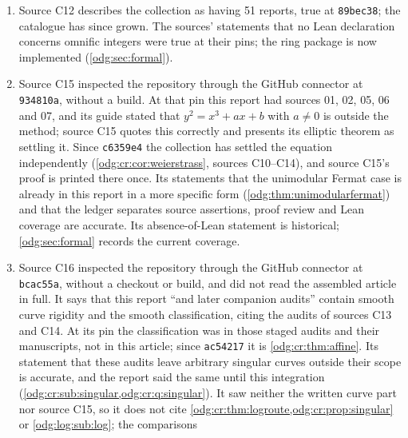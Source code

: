 \documentclass[11pt,oneside]{article}
\numberwithin{equation}{section}
\theoremstyle{definition}
\theoremstyle{remark}
\newcommand{\fn}[1]{\nolinkurl{#1}}
\begin{document}
\begin{enumerate}[leftmargin=*]
\nolinkurl{4c26f4e4bee62f76428d7c69adf4aabe5af5ec53} at \texttt{4cdeaec} (C10, C13,
C14) and \nolinkurl{47af413cd5f5d186a8c1391514d69e9933034498} at \texttt{89bec38}
(C12), the same blob as at \texttt{f6e031a} (C11). Source C14 describes the report as a three-source
assembly and source C11 says that its guide separates the reviewed Sections 1--7 from
later material; both were true at their pins. The report now has fourteen sources, and
the reviews recorded in \fn{RECONCILIATION.md} extend further, but do not cover
\cref{odg:cr:sec:principle,odg:cr:sec:curves,odg:cr:sec:groups}.
\item Source C12 describes the collection as having 51 reports, true at
\texttt{89bec38}; the catalogue has since grown. The sources' statements that no Lean
declaration concerns omnific integers were true at their pins; the ring package
is now implemented (\cref{odg:sec:formal}).
\item Source C15 inspected the repository through the GitHub connector at
\texttt{934810a}, without a build. At that pin this report had sources 01, 02, 05, 06
and 07, and its guide stated that $y^2=x^3+ax+b$ with $a\ne0$ is outside the method;
source C15 quotes this correctly and presents its elliptic theorem as settling it. Since
\texttt{c6359e4} the collection has settled the equation independently
(\cref{odg:cr:cor:weierstrass}, sources C10--C14), and source C15's proof is printed
there once. Its statements that the unimodular Fermat case is already in this report in a
more specific form (\cref{odg:thm:unimodularfermat}) and that the ledger separates source
assertions, proof review and Lean coverage are accurate. Its absence-of-Lean
statement is historical; \cref{odg:sec:formal} records the current coverage.
\item Source C16 inspected the repository through the GitHub connector at
\texttt{bcac55a}, without a checkout or build, and did not read the assembled article in
full. It says that this report ``and later companion audits'' contain smooth curve
rigidity and the smooth classification, citing the audits of sources C13 and C14. At its
pin the classification was in those staged audits and their manuscripts, not in this
article; since \texttt{ac54217} it is \cref{odg:cr:thm:affine}. Its statement that these
audits leave arbitrary singular curves outside their scope is accurate, and the report
said the same until this integration (\cref{odg:cr:sub:singular,odg:cr:q:singular}). It saw
neither the written curve part nor source C15, so it does not cite
\cref{odg:cr:thm:logroute,odg:cr:prop:singular} or \cref{odg:log:sub:log}; the comparisons

\end{enumerate}
\end{document}
